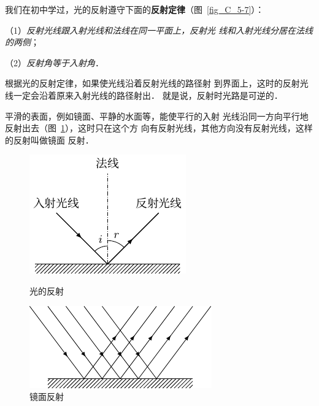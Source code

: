 我们在初中学过，光的反射遵守下面的\textbf{反射定律}（图~\ref{fig_C_5-7}）：


（1）\textit{反射光线跟入射光线和法线在同一平面上，反射光
线和入射光线分居在法线的两侧}；

（2）\textit{反射角等于入射角}．


根据光的反射定律，如果使光线沿着反射光线的路径射
到界面上，这时的反射光线一定会沿着原来入射光线的路径射出．
就是说，反射时光路是可逆的．

平滑的表面，例如镜面、平静的水面等，能使平行的入射
光线沿同一方向平行地反射出去（图~\ref{fig_C_5-8}），这时只在这个方
向有反射光线，其他方向没有反射光线，这样的反射叫做镜面
反射．
\begin{figure}[htbp]
    \centering
    \begin{minipage}[t]{0.48\textwidth}
        \centering
        \includegraphics{fig/C/5-7.pdf}
        \caption{光的反射}\label{fig_C_5-7}
    \end{minipage}
    \begin{minipage}[t]{0.48\textwidth}
        \centering
        \includegraphics{fig/C/5-8.pdf}
        \caption{镜面反射}\label{fig_C_5-8}
    \end{minipage}
\end{figure}

